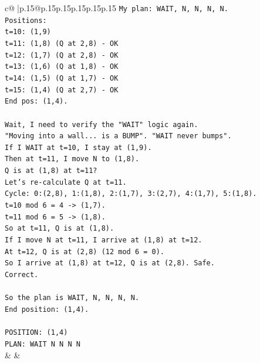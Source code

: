 \documentclass{article}
\begin{document}
{\begin{supertabular}{c@{$\;$}|p{.15\linewidth}@{}p{.15\linewidth}p{.15\linewidth}p{.15\linewidth}p{.15\linewidth}p{.15\linewidth}}
{{{\texttt{My plan: WAIT, N, N, N, N.} \\
\texttt{Positions:} \\
\texttt{t=10: (1,9)} \\
\texttt{t=11: (1,8) (Q at 2,8) {-} OK} \\
\texttt{t=12: (1,7) (Q at 2,8) {-} OK} \\
\texttt{t=13: (1,6) (Q at 1,8) {-} OK} \\
\texttt{t=14: (1,5) (Q at 1,7) {-} OK} \\
\texttt{t=15: (1,4) (Q at 2,7) {-} OK} \\
\texttt{End pos: (1,4).} \\
\\ 
\texttt{Wait, I need to verify the "WAIT" logic again.} \\
\texttt{"Moving into a wall... is a BUMP". "WAIT never bumps".} \\
\texttt{If I WAIT at t=10, I stay at (1,9).} \\
\texttt{Then at t=11, I move N to (1,8).} \\
\texttt{Q is at (1,8) at t=11?} \\
\texttt{Let's re{-}calculate Q at t=11.} \\
\texttt{Cycle: 0:(2,8), 1:(1,8), 2:(1,7), 3:(2,7), 4:(1,7), 5:(1,8).} \\
\texttt{t=10 mod 6 = 4 {-}> (1,7).} \\
\texttt{t=11 mod 6 = 5 {-}> (1,8).} \\
\texttt{So at t=11, Q is at (1,8).} \\
\texttt{If I move N at t=11, I arrive at (1,8) at t=12.} \\
\texttt{At t=12, Q is at (2,8) (12 mod 6 = 0).} \\
\texttt{So I arrive at (1,8) at t=12, Q is at (2,8). Safe.} \\
\texttt{Correct.} \\
\\ 
\texttt{So the plan is WAIT, N, N, N, N.} \\
\texttt{End position: (1,4).} \\
\\ 
\texttt{POSITION: (1,4)} \\
\texttt{PLAN: WAIT N N N N} \\
            }
        }
    }
    & & \\ \\


\end{supertabular}}
\end{document}
